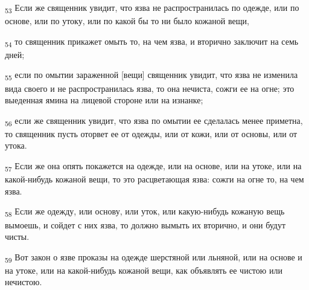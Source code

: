 \begin{tcolorbox}
\textsubscript{53} Если же священник увидит, что язва не распространилась по одежде, или по основе, или по утоку, или по какой бы то ни было кожаной вещи,
\end{tcolorbox}
\begin{tcolorbox}
\textsubscript{54} то священник прикажет омыть то, на чем язва, и вторично заключит на семь дней;
\end{tcolorbox}
\begin{tcolorbox}
\textsubscript{55} если по омытии зараженной [вещи] священник увидит, что язва не изменила вида своего и не распространилась язва, то она нечиста, сожги ее на огне; это выеденная ямина на лицевой стороне или на изнанке;
\end{tcolorbox}
\begin{tcolorbox}
\textsubscript{56} если же священник увидит, что язва по омытии ее сделалась менее приметна, то священник пусть оторвет ее от одежды, или от кожи, или от основы, или от утока.
\end{tcolorbox}
\begin{tcolorbox}
\textsubscript{57} Если же она опять покажется на одежде, или на основе, или на утоке, или на какой-нибудь кожаной вещи, то это расцветающая язва: сожги на огне то, на чем язва.
\end{tcolorbox}
\begin{tcolorbox}
\textsubscript{58} Если же одежду, или основу, или уток, или какую-нибудь кожаную вещь вымоешь, и сойдет с них язва, то должно вымыть их вторично, и они будут чисты.
\end{tcolorbox}
\begin{tcolorbox}
\textsubscript{59} Вот закон о язве проказы на одежде шерстяной или льняной, или на основе и на утоке, или на какой-нибудь кожаной вещи, как объявлять ее чистою или нечистою.
\end{tcolorbox}
